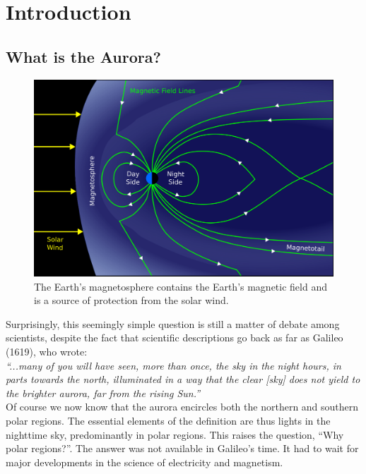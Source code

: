 \documentclass{article}
\newcommand{\contributed}[1]{%
    \par\noindent
    \begingroup
    \setlength{\leftskip}{1em}%
    \itshape
    Contributors: #1
    \par
    \endgroup
    \vspace{0.5em}
}
\begin{document}
\section{Introduction}

\subsection{What is the Aurora?} 


\begin{figure}
\includegraphics[width=\linewidth]{Fig1_magnetosphere.png}
\caption{The Earth's magnetosphere contains the Earth's magnetic field and is a source of protection from the solar wind.}
\label{fig:magnetosphere}
\end{figure}

Surprisingly, this seemingly simple question is still a matter of debate among scientists, despite the fact that scientific descriptions go back as far as Galileo (1619), who wrote:\\

\textit{``...many of you will have seen, more than once, the sky in the night hours, in parts towards the north, illuminated in a way that the clear [sky] does not yield to the brighter aurora, far from the rising Sun.''}\\

Of course we now know that the aurora encircles both the northern and southern polar regions. The essential elements of the definition are thus lights in the nighttime sky, predominantly in polar regions. This raises the question, ``Why polar regions?''. The answer was not available in Galileo's time. It had to wait for major developments in the science of electricity and magnetism. 
\end{document}
